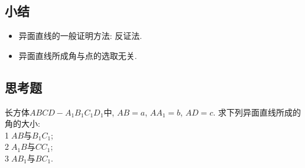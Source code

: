 \documentclass{article}
\begin{document}
\begin{CJK}{UTF8}{gkai}
\subsection{小结}
\begin{itemize}
\item 异面直线的一般证明方法: 反证法.
\item 异面直线所成角与点的选取无关.
\end{itemize}

\subsection{思考题}
长方体$ABCD-A_1B_1C_1D_1$中, $AB = a$, $AA_1 = b$, $AD = c$. 求下列异面直线所成的角的大小:\\
\textcircled{1}$AB$与$B_1C_1$;\\
\textcircled{2}$A_1B$与$CC_1$;\\
\textcircled{3}$AB_1$与$BC_1$.\\


\end{CJK}
\end{document}
